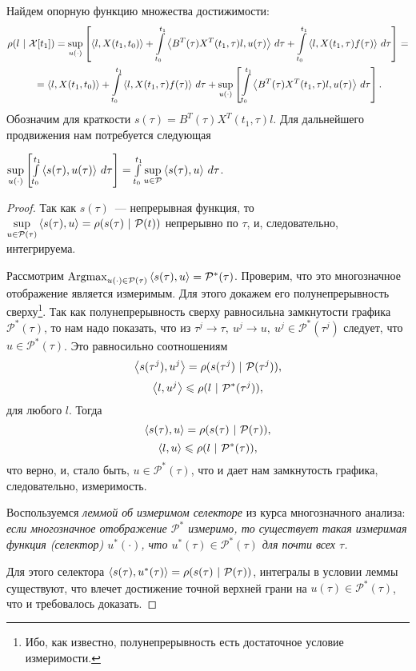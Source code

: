 Найдем опорную функцию множества достижимости:
\begin{multline}
\label{QT_4}
  \rho(l\ |\ \mathcal{X}[t_1]) =
  \sup\limits_{u(\cdot)}
  \left[
    \left<l,X(t_1, t_0)\right> +
    \int\limits_{t_0}^{t_1}\left<B^T(\tau)X^T(t_1, \tau)l,u(\tau)\right>\,d\tau +
    \int\limits_{t_0}^{t_1}\left<l,X(t_1, \tau)f(\tau)\right>\,d\tau
  \right] =\\
  {}= \left<l,X(t_1,t_0)\right> +
  \int\limits_{t_0}^{t_1}\left<l,X(t_1, \tau)f(\tau)\right>\,d\tau +
  \sup\limits_{u(\cdot)}
  \left[
    \int\limits_{t_0}^{t_1}\left<B^T(\tau)X^T(t_1, \tau)l,u(\tau)\right>\,d\tau
  \right].
\end{multline}
Обозначим для краткости
$s(\tau) = B^T(\tau)X^T(t_1, \tau)l$.
Для дальнейшего продвижения нам потребуется следующая
\begin{lemma}
  $
    \sup\limits_{u(\cdot)}
    \left[
      \int\limits_{t_0}^{t_1}\left<s(\tau),u(\tau)\right>\,d\tau
    \right] =
    \int\limits_{t_0}^{t_1}
    \sup\limits_{u \in \mathcal{P}}\left<s(\tau),u\right>\,d\tau
  $.
\end{lemma}
\begin{proof}
  Так как $s(\tau)$~--- непрерывная функция, то
  $\sup\limits_{u \in \mathcal{P}(\tau)}\left<s(\tau),u\right> =
  \rho(s(\tau)\ |\ \mathcal{P}(t))$ непрерывно по $\tau$, и, следовательно,
  интегрируема.

  Рассмотрим
  $\operatorname{Argmax}\limits_{u(\cdot) \in \mathcal{P}(\tau)}\left<s(\tau),u\right> =
  \mathcal{P}^*(\tau)$. Проверим, что это многозначное
  отображение является измеримым.
  Для этого докажем его полунепрерывность
  сверху\footnote{Ибо, как известно,
  полунепрерывность есть достаточное условие измеримости.}.
  Так как полунепрерывность сверху равносильна
  замкнутости графика $\mathcal{P}^*(\tau)$,
  то нам надо показать, что из
  $\tau^j \to \tau,\ u^j \to u, \ u^j \in \mathcal{P}^*(\tau^j)$ следует,
  что $u \in \mathcal{P}^*(\tau)$. Это равносильно соотношениям
  $$
    \scalar{s(\tau^j)}{u^j} = \rho(s(\tau^j)\ |\ \mathcal{P}(\tau^j)),
  $$
  $$
    \scalar{l}{u^j} \leqslant \rho(l\ |\ \mathcal{P}^*(\tau^j)),
  $$
  для любого $l$. Тогда 
  $$
    \scalar{s(\tau)}{u} = \rho(s(\tau)\ |\ \mathcal{P}(\tau)),
  $$
  $$
    \scalar{l}{u} \leqslant \rho(l\ |\ \mathcal{P}^*(\tau)),
  $$
  что верно, и, стало быть, $u \in \mathcal{P}^*(\tau)$,
  что и дает нам замкнутость графика, следовательно, измеримость. 

  Воспользуемся \textit{леммой об измеримом селекторе}
  из курса многозначного анализа:
  \textit{если многозначное отображение $\mathcal{P}^*$ измеримо,
  то существует такая измеримая функция (селектор) $u^*(\cdot)$,
  что $u^*(\tau) \in \mathcal{P}^*(\tau)$ для почти всех $\tau$.} 

  Для этого селектора
  $\scalar{s(\tau)}{u^*(\tau)} = \rho(s(\tau)\ |\ \mathcal{P}(\tau))$,
  интегралы в условии леммы существуют,
  что влечет достижение точной верхней грани на
  $u(\tau) \in \mathcal{P}^*(\tau)$, что и требовалось доказать.
\end{proof}

